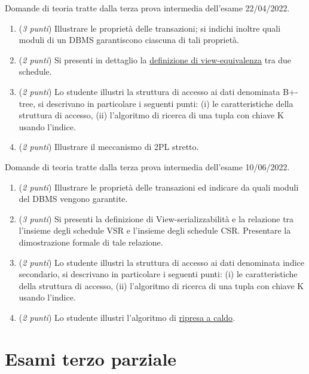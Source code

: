 \documentclass[a4paper]{article}
\begin{document}
	Domande di teoria tratte dalla terza prova intermedia dell'esame 22/04/2022.
	\begin{enumerate}
		\item (\emph{3 punti}) Illustrare le proprietà delle transazioni; si indichi inoltre quali moduli di un DBMS garantiscono ciascuna di tali proprietà.
		
		\item (\emph{2 punti}) Si presenti in dettaglio la \underline{definizione di view-equivalenza} tra due schedule.
		
		\item (\emph{2 punti}) Lo studente illustri la struttura di accesso ai dati denominata B+-tree, si descrivano in particolare i seguenti punti: (i) le caratteristiche della struttura di accesso, (ii) l'algoritmo di ricerca di una tupla con chiave K usando l'indice.
		
		\item (\emph{2 punti}) Illustrare il meccanismo di 2PL stretto.
	\end{enumerate}\newpage
	
	Domande di teoria tratte dalla terza prova intermedia dell'esame 10/06/2022.
	\begin{enumerate}
		\item (\emph{2 punti}) Illustrare le proprietà delle transazioni ed indicare da quali moduli del DBMS vengono garantite.
		
		\item (\emph{3 punti}) Si presenti la definizione di View-serializzabilità e la relazione tra l'insieme degli schedule VSR e l'insieme degli schedule CSR. Presentare la dimostrazione formale di tale relazione.
		
		\item (\emph{2 punti}) Lo studente illustri la struttura di accesso ai dati denominata indice secondario, si descrivano in particolare i seguenti punti: (i) le caratteristiche della struttura di accesso, (ii) l'algoritmo di ricerca di una tupla con chiave K usando l'indice.
		
		\item (\emph{2 punti}) Lo studente illustri l'algoritmo di \underline{ripresa a caldo}.
	\end{enumerate}\newpage
	
	\section{Esami terzo parziale}
	
\end{document}
